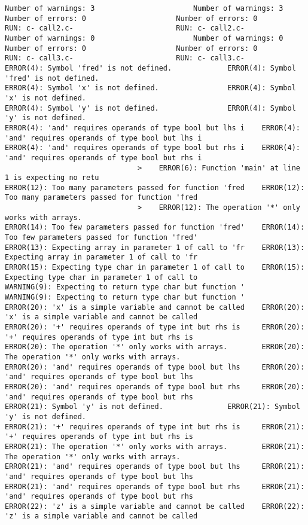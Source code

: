 \documentclass[12pt]{book}
\begin{document}
\begin{lstlisting}
Number of warnings: 3						Number of warnings: 3
Number of errors: 0						Number of errors: 0
RUN: c- call2.c-						RUN: c- call2.c-
Number of warnings: 0						Number of warnings: 0
Number of errors: 0						Number of errors: 0
RUN: c- call3.c-						RUN: c- call3.c-
ERROR(4): Symbol 'fred' is not defined.				ERROR(4): Symbol 'fred' is not defined.
ERROR(4): Symbol 'x' is not defined.				ERROR(4): Symbol 'x' is not defined.
ERROR(4): Symbol 'y' is not defined.				ERROR(4): Symbol 'y' is not defined.
ERROR(4): 'and' requires operands of type bool but lhs i	ERROR(4): 'and' requires operands of type bool but lhs i
ERROR(4): 'and' requires operands of type bool but rhs i	ERROR(4): 'and' requires operands of type bool but rhs i
							   >	ERROR(6): Function 'main' at line 1 is expecting no retu
ERROR(12): Too many parameters passed for function 'fred	ERROR(12): Too many parameters passed for function 'fred
							   >	ERROR(12): The operation '*' only works with arrays.
ERROR(14): Too few parameters passed for function 'fred'	ERROR(14): Too few parameters passed for function 'fred'
ERROR(13): Expecting array in parameter 1 of call to 'fr	ERROR(13): Expecting array in parameter 1 of call to 'fr
ERROR(15): Expecting type char in parameter 1 of call to	ERROR(15): Expecting type char in parameter 1 of call to
WARNING(9): Expecting to return type char but function '	WARNING(9): Expecting to return type char but function '
ERROR(20): 'x' is a simple variable and cannot be called	ERROR(20): 'x' is a simple variable and cannot be called
ERROR(20): '+' requires operands of type int but rhs is 	ERROR(20): '+' requires operands of type int but rhs is 
ERROR(20): The operation '*' only works with arrays.		ERROR(20): The operation '*' only works with arrays.
ERROR(20): 'and' requires operands of type bool but lhs 	ERROR(20): 'and' requires operands of type bool but lhs 
ERROR(20): 'and' requires operands of type bool but rhs 	ERROR(20): 'and' requires operands of type bool but rhs 
ERROR(21): Symbol 'y' is not defined.				ERROR(21): Symbol 'y' is not defined.
ERROR(21): '+' requires operands of type int but rhs is 	ERROR(21): '+' requires operands of type int but rhs is 
ERROR(21): The operation '*' only works with arrays.		ERROR(21): The operation '*' only works with arrays.
ERROR(21): 'and' requires operands of type bool but lhs 	ERROR(21): 'and' requires operands of type bool but lhs 
ERROR(21): 'and' requires operands of type bool but rhs 	ERROR(21): 'and' requires operands of type bool but rhs 
ERROR(22): 'z' is a simple variable and cannot be called	ERROR(22): 'z' is a simple variable and cannot be called

\end{lstlisting}
\end{document}
